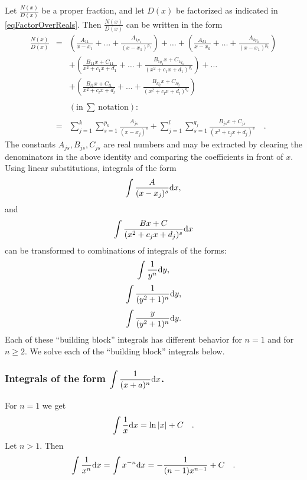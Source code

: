 \documentclass[12pt]{book}
\begin{document}
Let $\frac{N(x)}{D(x)}$ be a proper fraction, and let $D(x)$ be factorized as indicated in \eqref{eqFactorOverReals}. Then $\frac{N(x)}{D(x)}$ can be written in the form
\begin{equation}\label{eqSplitPF}
\begin{array}{rcl}
\displaystyle\frac{N(x)}{D(x)}&=&\displaystyle \left (\frac{A_{11}}{x-x_1}+\dots +\frac{A_{1p_1}}{(x-x_1)^{p_1}}\right) +\dots + \left (\frac{A_{k1}}{x-x_k}+\dots +\frac{A_{kp_k}}{(x-x_1)^{p_k}}\right) \\
&&\displaystyle+\left(\frac {B_{11}x+C_{11}}{x^2+c_1x+d_1}+\dots +\frac {B_{1q_1}x+C_{1q_1}}{(x^2+c_1x+d_1)^{q_1}} \right)+\dots
\\&&\displaystyle +
\left(\frac {B_{l1}x+C_{l1}}{x^2+c_lx+d_l}+\dots +\frac {B_{lq_l}x+C_{lq_l}}{(x^2+c_lx+d_l)^{q_l}} \right)\\ \\
&&(\mathrm{in~}\sum\mathrm{~notation}):\\ \\
&=&\displaystyle \sum_{j=1}^{k}\sum_{s=1}^{p_k} \frac{A_{js}}{(x-x_j)^s}+\sum_{j=1}^{l}\sum_{s=1}^{q_j} \frac{B_{js}x+C_{js}}{(x^2+c_jx+d_j)^s}\quad .
\end{array}
\end{equation}
The constants $A_{js}, B_{js}, C_{js}$ are real numbers and may be extracted by clearing the denominators in the above identity and comparing the coefficients in front of $x$.
Using linear substitutions, integrals of the form
\[
\displaystyle\int \frac{A}{(x-x_j)^s}{\normalfont \text{d}} x,
\]
and
\[
\int \frac{Bx+C}{(x^2+c_jx+d_j)^s}{\normalfont \text{d}} x
\]
can be transformed to combinations of integrals of the forms:
\[
\int \frac{1}{y^n}{\normalfont \text{d}} y,
\]
\[
\int \frac{1}{(y^2+1)^n}{\normalfont \text{d}} y,
\]
\[\int \frac{y}{(y^2+1)^n}{\normalfont \text{d}} y.
\]
Each of these ``building block'' integrals has different behavior for $n=1$ and for $n\geq 2$. We solve each of the ``building block'' integrals below.

\subsubsection{Integrals of the form $\displaystyle\int \frac{1}{(x+a)^n}{\normalfont \text{d}} x$.}
For $n=1$ we get
\begin{equation}\label{eqBuildingBlockInt1base}
\int \frac{1}{x}{\normalfont \text{d}} x=\ln |x| +C\quad .
\end{equation}
Let $n> 1$. Then
\begin{equation}\label{eqBuildingBlockInt1N}
\int \frac{1}{x^n}{\normalfont \text{d}} x=\int x^{-n}{\normalfont \text{d}} x= -\frac{1}{(n-1)x^{n-1}}+C \quad .
\end{equation}
\end{document}
